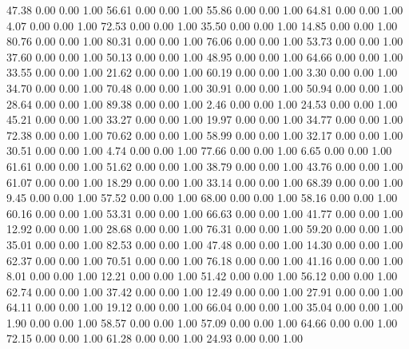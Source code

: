    47.38   0.00   0.00   1.00
   56.61   0.00   0.00   1.00
   55.86   0.00   0.00   1.00
   64.81   0.00   0.00   1.00
    4.07   0.00   0.00   1.00
   72.53   0.00   0.00   1.00
   35.50   0.00   0.00   1.00
   14.85   0.00   0.00   1.00
   80.76   0.00   0.00   1.00
   80.31   0.00   0.00   1.00
   76.06   0.00   0.00   1.00
   53.73   0.00   0.00   1.00
   37.60   0.00   0.00   1.00
   50.13   0.00   0.00   1.00
   48.95   0.00   0.00   1.00
   64.66   0.00   0.00   1.00
   33.55   0.00   0.00   1.00
   21.62   0.00   0.00   1.00
   60.19   0.00   0.00   1.00
    3.30   0.00   0.00   1.00
   34.70   0.00   0.00   1.00
   70.48   0.00   0.00   1.00
   30.91   0.00   0.00   1.00
   50.94   0.00   0.00   1.00
   28.64   0.00   0.00   1.00
   89.38   0.00   0.00   1.00
    2.46   0.00   0.00   1.00
   24.53   0.00   0.00   1.00
   45.21   0.00   0.00   1.00
   33.27   0.00   0.00   1.00
   19.97   0.00   0.00   1.00
   34.77   0.00   0.00   1.00
   72.38   0.00   0.00   1.00
   70.62   0.00   0.00   1.00
   58.99   0.00   0.00   1.00
   32.17   0.00   0.00   1.00
   30.51   0.00   0.00   1.00
    4.74   0.00   0.00   1.00
   77.66   0.00   0.00   1.00
    6.65   0.00   0.00   1.00
   61.61   0.00   0.00   1.00
   51.62   0.00   0.00   1.00
   38.79   0.00   0.00   1.00
   43.76   0.00   0.00   1.00
   61.07   0.00   0.00   1.00
   18.29   0.00   0.00   1.00
   33.14   0.00   0.00   1.00
   68.39   0.00   0.00   1.00
    9.45   0.00   0.00   1.00
   57.52   0.00   0.00   1.00
   68.00   0.00   0.00   1.00
   58.16   0.00   0.00   1.00
   60.16   0.00   0.00   1.00
   53.31   0.00   0.00   1.00
   66.63   0.00   0.00   1.00
   41.77   0.00   0.00   1.00
   12.92   0.00   0.00   1.00
   28.68   0.00   0.00   1.00
   76.31   0.00   0.00   1.00
   59.20   0.00   0.00   1.00
   35.01   0.00   0.00   1.00
   82.53   0.00   0.00   1.00
   47.48   0.00   0.00   1.00
   14.30   0.00   0.00   1.00
   62.37   0.00   0.00   1.00
   70.51   0.00   0.00   1.00
   76.18   0.00   0.00   1.00
   41.16   0.00   0.00   1.00
    8.01   0.00   0.00   1.00
   12.21   0.00   0.00   1.00
   51.42   0.00   0.00   1.00
   56.12   0.00   0.00   1.00
   62.74   0.00   0.00   1.00
   37.42   0.00   0.00   1.00
   12.49   0.00   0.00   1.00
   27.91   0.00   0.00   1.00
   64.11   0.00   0.00   1.00
   19.12   0.00   0.00   1.00
   66.04   0.00   0.00   1.00
   35.04   0.00   0.00   1.00
    1.90   0.00   0.00   1.00
   58.57   0.00   0.00   1.00
   57.09   0.00   0.00   1.00
   64.66   0.00   0.00   1.00
   72.15   0.00   0.00   1.00
   61.28   0.00   0.00   1.00
   24.93   0.00   0.00   1.00
